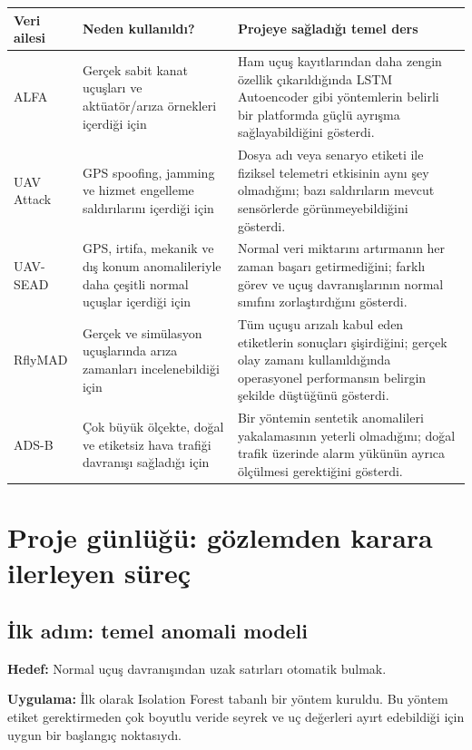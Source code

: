\documentclass[11pt,a4paper]{article}
\begin{document}
\begin{longtable}{p{}p{}p{}}
\toprule
\textbf{Veri ailesi} & \textbf{Neden kullanıldı?} & \textbf{Projeye sağladığı temel ders} \\
\midrule
\endhead
ALFA &
Gerçek sabit kanat uçuşları ve aktüatör/arıza örnekleri içerdiği için &
Ham uçuş kayıtlarından daha zengin özellik çıkarıldığında LSTM Autoencoder
gibi yöntemlerin belirli bir platformda güçlü ayrışma sağlayabildiğini gösterdi. \\

UAV Attack &
GPS spoofing, jamming ve hizmet engelleme saldırılarını içerdiği için &
Dosya adı veya senaryo etiketi ile fiziksel telemetri etkisinin aynı şey
olmadığını; bazı saldırıların mevcut sensörlerde görünmeyebildiğini gösterdi. \\

UAV-SEAD &
GPS, irtifa, mekanik ve dış konum anomalileriyle daha çeşitli normal uçuşlar
içerdiği için &
Normal veri miktarını artırmanın her zaman başarı getirmediğini; farklı görev ve
uçuş davranışlarının normal sınıfını zorlaştırdığını gösterdi. \\

RflyMAD &
Gerçek ve simülasyon uçuşlarında arıza zamanları incelenebildiği için &
Tüm uçuşu arızalı kabul eden etiketlerin sonuçları şişirdiğini; gerçek olay
zamanı kullanıldığında operasyonel performansın belirgin şekilde düştüğünü gösterdi. \\

ADS-B &
Çok büyük ölçekte, doğal ve etiketsiz hava trafiği davranışı sağladığı için &
Bir yöntemin sentetik anomalileri yakalamasının yeterli olmadığını; doğal trafik
üzerinde alarm yükünün ayrıca ölçülmesi gerektiğini gösterdi. \\
\bottomrule
\end{longtable}

\section{Proje günlüğü: gözlemden karara ilerleyen süreç}

\subsection{İlk adım: temel anomali modeli}

\textbf{Hedef:} Normal uçuş davranışından uzak satırları otomatik bulmak.

\textbf{Uygulama:} İlk olarak Isolation Forest tabanlı bir yöntem kuruldu.
Bu yöntem etiket gerektirmeden çok boyutlu veride seyrek ve uç değerleri
ayırt edebildiği için uygun bir başlangıç noktasıydı.
\end{document}
